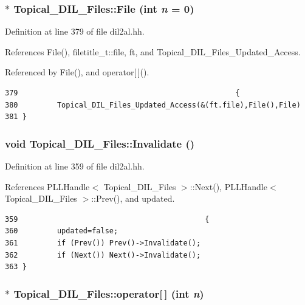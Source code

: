 \subsubsection{ $\ast$ Topical\_\-DIL\_\-Files::File (int {\em n} = 0)\hspace{0.3cm}{\tt  [inline]}}\label{classTopical__DIL__Files_a3}




Definition at line 379 of file dil2al.hh.

References File(), filetitle\_\-t::file, ft, and Topical\_\-DIL\_\-Files\_\-Updated\_\-Access.

Referenced by File(), and operator[$\,$]().



\footnotesize\begin{verbatim}379                                                  {
380         Topical_DIL_Files_Updated_Access(&(ft.file),File(),File)
381 }
\end{verbatim}\normalsize 
{}
\subsubsection{\setlength{\rightskip}{0pt plus 5cm}void Topical\_\-DIL\_\-Files::Invalidate ()\hspace{0.3cm}{\tt  [inline]}}\label{classTopical__DIL__Files_a6}




Definition at line 359 of file dil2al.hh.

References PLLHandle$<$ Topical\_\-DIL\_\-Files $>$::Next(), PLLHandle$<$ Topical\_\-DIL\_\-Files $>$::Prev(), and updated.



\footnotesize\begin{verbatim}359                                           {
360         updated=false;
361         if (Prev()) Prev()->Invalidate();
362         if (Next()) Next()->Invalidate();
363 }
\end{verbatim}\normalsize 
{}
\subsubsection{ $\ast$ Topical\_\-DIL\_\-Files::operator[$\,$] (int {\em n})\hspace{0.3cm}{\tt  [inline]}}\label{classTopical__DIL__Files_a2}




